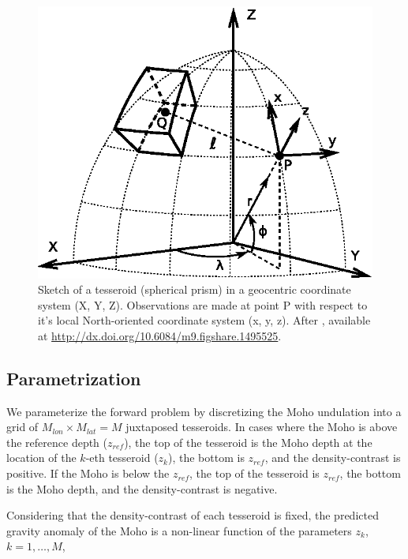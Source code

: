 \documentclass[extra,mreferee]{gji}
\begin{document}
\begin{figure}
    \centering
    \includegraphics[width=\columnwidth]{figures/paper/tesseroid-coord-sys}
    \caption{Sketch of a tesseroid (spherical prism) in a geocentric coordinate
        system (X, Y, Z).
        Observations are made at point P with respect to it's local
        North-oriented coordinate system (x, y, z).
        After \citet{uieda2015},
        available at
        \url{http://dx.doi.org/10.6084/m9.figshare.1495525}.
    }
    \label{fig:tesseroid}
\end{figure}



\subsection{Parametrization}

We parameterize the forward problem by discretizing the Moho undulation
into a grid of $M_{lon} \times M_{lat} = M$ juxtaposed tesseroids.
In cases where the Moho is above the reference depth ($z_{ref}$),
the top of the tesseroid is the Moho depth at the location of the $k$-eth
tesseroid ($z_{k}$),
the bottom is $z_{ref}$, and the density-contrast is positive.
If the Moho is below the $z_{ref}$, the top of the tesseroid is $z_{ref}$,
the bottom is the Moho depth, and the density-contrast is negative.

Considering that the density-contrast of each tesseroid is fixed,
the predicted gravity anomaly of the Moho is a non-linear function of the
parameters $z_k$, $k=1, \ldots, M$,
\end{document}
